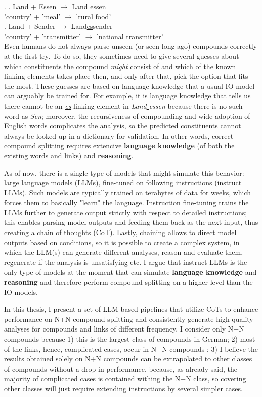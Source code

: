 \documentclass[11pt]{article}
\begin{document}
\ex. 
\ag. \label{ex3:1}Land + Essen {$\rightarrow$} Land\underline{ }essen \\
'country' + 'meal' {$\rightarrow$} {'rural food'} \\
\bg. \label{ex3:2}Land + Sender {$\rightarrow$} Land\underline{es}sender \\
'country' + 'transmitter' {$\rightarrow$} {'national transmitter'} \\


Even humans do not always parse unseen (or seen long ago) compounds correctly at the first try. To do so, they sometimes need to give several guesses about which constituents the compound \textit{might} consist of and which of the known linking elements takes place then, and only after that, pick the option that fits the most. These guesses are based on language knowledge that a usual IO model can arguably be trained for. For example, it is language knowledge that tells us there cannot be an \textit{\underline{es}} linking element in \textit{Land\underline{ }essen} because there is no such word as \textit{Sen}; moreover, the recursiveness of compounding and wide adoption of English words complicates the analysis, so the predicted constituents cannot always be looked up in a dictionary for validation. In other words, correct compound splitting requires extencive \textbf{language knowledge} (of both the existing words and links) and \textbf{reasoning}.

As of now, there is a single type of models that might simulate this behavior: large language models (LLMs), fine-tuned on following instructions (instruct LLMs). Such models are typically trained on terabytes of data for weeks, which forces them to basically "learn" the language. Instruction fine-tuning trains the LLMs further to generate output strictly with respect to detailed instructions; this enables parsing model outputs and feeding them back as the next input, thus creating a chain of thoughts (CoT). Lastly, chaining allows to direct model outputs based on conditions, so it is possible to create a complex system, in which the LLM(s) can generate different analyses, reason and evaluate them, regenerate if the analysis is unsatisfying etc. I argue that instruct LLMs is the only type of models at the moment that can simulate \textbf{language knowledge} and \textbf{reasoning} and therefore perform compound splitting on a higher level than the IO models.

In this thesis, I present a set of LLM-based pipelines that utilize CoTs to enhance performance on N+N compound splitting and consistently generate high-quality analyses for compounds and links of different frequency. I consider only N+N compounds because 1) this is the largest class of compounds in German; 2) most of the links, hence, complicated cases, occur in N+N compounds \cite{Schlucker2022}; 3) I believe the results obtained solely on N+N compounds can be extrapolated to other classes of compounds without a drop in performance, because, as already said, the majority of complicated cases is contained withing the N+N class, so covering other classes will just require extending instructions by several simpler cases.
\end{document}
